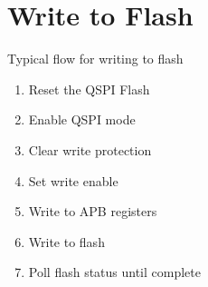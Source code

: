 \documentclass{report}
\begin{document}
\section{Write to Flash}
Typical flow for writing to flash 
\begin{enumerate}
    \item Reset the QSPI Flash
    \item Enable QSPI mode
    \item Clear write protection
    \item Set write enable 
    \item Write to APB registers
    \item Write to flash
    \item Poll flash status until complete
\end{enumerate}
\end{document}
